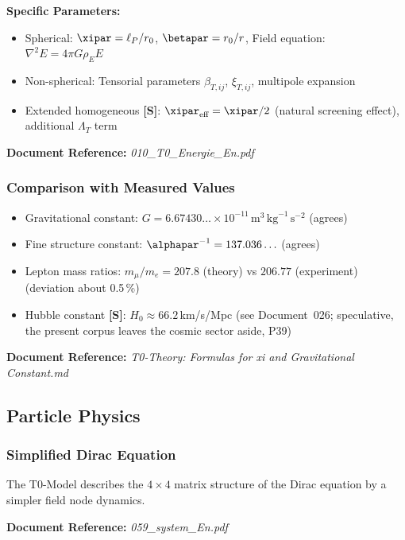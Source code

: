 \textbf{Specific Parameters:}
\begin{itemize}
	\item Spherical: $\xipar = \ell_P/r_0$, $\betapar = r_0/r$, Field equation: $\nabla^2 E = 4\pi G \rho_E E$
	\item Non-spherical: Tensorial parameters $\beta_{T,ij}$, $\xi_{T,ij}$, multipole expansion
	\item Extended homogeneous \textbf{[S]}: $\xipar_{\text{eff}} = \xipar/2$ (natural screening effect), additional $\Lambda_T$ term
\end{itemize}

\textbf{Document Reference:} \textit{010\_T0\_Energie\_En.pdf}

\subsubsection{Comparison with Measured Values}

\begin{itemize}
	\item Gravitational constant: $G = 6.67430\ldots \times 10^{-11} \, \text{m}^3 \, \text{kg}^{-1} \, \text{s}^{-2}$ (agrees)
	\item Fine structure constant: $\alphapar^{-1} = 137.036\ldots$ (agrees)
	\item Lepton mass ratios: $m_\mu/m_e = 207.8$ (theory) vs $206.77$ (experiment) (deviation about 0.5\,\%)
	\item Hubble constant \textbf{[S]}: $H_0 \approx 66.2\,$km/s/Mpc (see Document~026; speculative, the present corpus leaves the cosmic sector aside, P39)
\end{itemize}

\textbf{Document Reference:} \textit{T0-Theory: Formulas for xi and Gravitational Constant.md}

\subsection{Particle Physics}

\subsubsection{Simplified Dirac Equation}

The T0-Model describes the $4 \times 4$ matrix structure of the Dirac equation by a simpler field node dynamics.

\textbf{Document Reference:} \textit{059\_system\_En.pdf}

